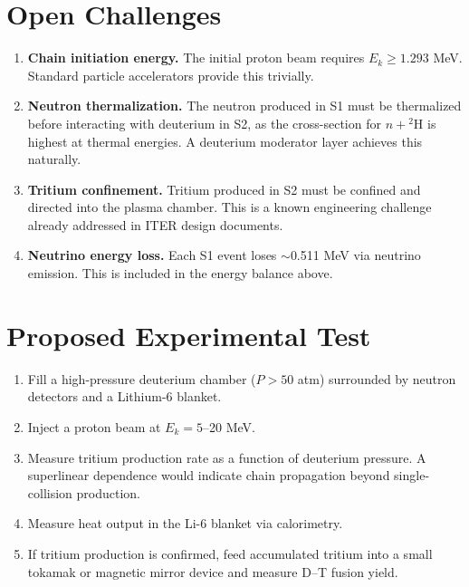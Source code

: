 \documentclass[12pt,a4paper]{article}
\begin{document}
\section{Open Challenges}

\begin{enumerate}

  \item \textbf{Chain initiation energy.}
    The initial proton beam requires $E_k \geq 1.293$ MeV.
    Standard particle accelerators provide this trivially.

  \item \textbf{Neutron thermalization.}
    The neutron produced in S1 must be thermalized before
    interacting with deuterium in S2, as the cross-section
    for $n + {}^2\text{H}$ is highest at thermal energies.
    A deuterium moderator layer achieves this naturally.

  \item \textbf{Tritium confinement.}
    Tritium produced in S2 must be confined and directed
    into the plasma chamber. This is a known engineering
    challenge already addressed in ITER design documents.

  \item \textbf{Neutrino energy loss.}
    Each S1 event loses $\sim$0.511 MeV via neutrino emission.
    This is included in the energy balance above.

\end{enumerate}

\section{Proposed Experimental Test}

\begin{enumerate}

  \item Fill a high-pressure deuterium chamber ($P > 50$ atm)
    surrounded by neutron detectors and a Lithium-6 blanket.

  \item Inject a proton beam at $E_k = 5$--20 MeV.

  \item Measure tritium production rate as a function of
    deuterium pressure. A superlinear dependence would indicate
    chain propagation beyond single-collision production.

  \item Measure heat output in the Li-6 blanket via calorimetry.

  \item If tritium production is confirmed, feed accumulated
    tritium into a small tokamak or magnetic mirror device
    and measure D--T fusion yield.

\end{enumerate}
\end{document}
